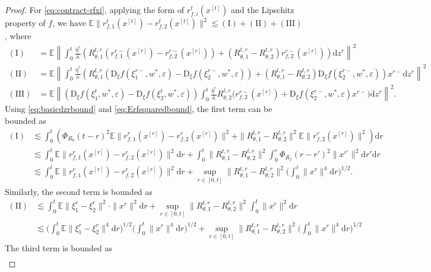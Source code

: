 \documentclass[11pt,letterpaper,reqno]{amsart}
\theoremstyle{definition}
\def\eps{\varepsilon}
\def\d{\mathrm{d}}
\def\D{\mathrm{D}}
\def\E{\mathbb{E}}
\def\Rt{R_\theta}
\def\Rf{R_f}
\def\pRt{\Phi_{\Rt}}
\def\pRf{\Phi_{\Rf}}
\def\nI{(\mathrm{I})}
\def\nII{(\mathrm{II})}
\def\nIII{(\mathrm{III})}
\newcommand{\norm}[1]{\|#1\|}
\newcommand{\prn}[1]{\left({#1}\right)} %
\begin{document}
\begin{proof}
For \eqref{eq:contract-rfxi}, applying the form of $r_{f,i}^t(x^{[t]})$
and the Lipschitz property of $f$, we have
$\E\|r_{f,1}^{t}(x^{[t]}) - r_{f,2}^{t}(x^{[t]})\|^2 \lesssim \nI+\nII+\nIII$,
where
\begin{align*}
\nI&=\E\left\|\int_{0}^{t}
\frac{\bar\eta^r}{\bar\kappa}
  \prn{R_{\theta,1}^{t,r}(r_{f,1}^{r-}(x^{[r]})-r_{f,2}^{r-}(x^{[r]}))+\prn{R_{\theta,1}^{t,r}-R_{\theta,2}^{t,r}}r_{f,2}^{r-}(x^{[r]})}
\d z^r\right\|^2\nonumber\\
\nII&=\E\left\|\int_{0}^{t}
\frac{\bar\eta^r}{\bar\kappa} \prn{R_{\theta,1}^{t,r}(\D_\xi f(\xi^{r-}_1,w^*,\eps)-\D_\xi f(\xi^{r-}_2,w^*,\eps))
+ \prn{R_{\theta,1}^{t,r}-R_{\theta,2}^{t,r}}\D_\xi f(\xi^{r-}_2,w^*,\eps)}
x^{r-} \d z^r\right\|^2\nonumber\\
\nIII&=\E\left\|\prn{\D_\xi f(\xi^t_1,w^*,\eps) - \D_\xi f(\xi^t_2,w^*,\eps)}
\int_{0}^{t}
  \frac{\bar\eta^r}{\bar\kappa} R_{\theta,2}^{t,r}\bigl(r_{f,2}^{r-}(x^{[r]})+\D_\xi f(\xi^{r-}_2,w^*,\eps)x^{r-}\bigr) \d z^r\right\|^2.
\end{align*}
Using \eqref{eq:basicdzrbound} and \eqref{eq:Erfsquaredbound},
the first term can be bounded as
\begin{align*}
\nI &\lesssim
\int_0^t\prn{\pRt(t-r)^2\E\big\|r_{f,1}^{r}(x^{[r]})-r_{f,2}^{r}(x^{[r]})\big\|^2
+ \norm{R_{\theta,1}^{t,r}-R_{\theta,2}^{t,r}}^2\E\norm{r_{f,2}^{r}(x^{[r]})}^2 }\d r\nonumber\\
&\lesssim \int_0^t \E\big\|r_{f,1}^{r}(x^{[r]})-r_{f,2}^{r}(x^{[r]})\big\|^2\d r
+\int_0^t \norm{R_{\theta,1}^{t,r}-R_{\theta,2}^{t,r}}^2 \int_0^r
\pRf(r-r')^2\norm{x^{r'}}^2\d r'\d r\nonumber\\
&\lesssim \int_0^t \E\big\|r_{f,1}^{r}(x^{[r]})-r_{f,2}^{r}(x^{[r]})\big\|^2\d
r+\sup_{r\in[0,t]}\norm{R_{\theta,1}^{t,r}-R_{\theta,2}^{t,r}}^2\Big(\int_0^t
\norm{x^r}^4\d r\Big)^{1/2}.
\end{align*}
Similarly, the second term is bounded as
\begin{align*}
\nII &\lesssim \int_0^t\E\norm{\xi_1^{r}-\xi_2^{r}}^2 \cdot \norm{x^r}^2\d r +
\sup_{r\in[0,t]}\norm{R_{\theta,1}^{t,r}-R_{\theta,2}^{t,r}}^2\int_0^t
\norm{x^r}^2\d r\\
&\lesssim 
\Big(\int_0^t \E\norm{\xi_1^{r}-\xi_2^{r}}^4 \d r\Big)^{1/2}
\Big(\int_0^t \norm{x^r}^4\d r\Big)^{1/2} +
\sup_{r\in[0,t]}\norm{R_{\theta,1}^{t,r}-R_{\theta,2}^{t,r}}^2
\Big(\int_0^t \norm{x^r}^4\d r\Big)^{1/2}
\end{align*}
The third term is bounded as
\begin{align*}

\end{align*}
\end{proof}
\end{document}
